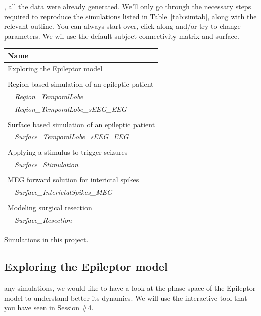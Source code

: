 \documentclass{tufte-handout}
\begin{document}
, all the data were already generated. We'll only go through the necessary steps 
required to reproduce the simulations listed in Table~\ref{tab:simtab}, along with the relevant outline.
You can always start over, click along and/or try to change parameters.
We wil use the default subject connectivity matrix and surface.


\begin{margintable}
  \centering
  \selectfont
  \begin{tabular}{l}
    \toprule
    Name \\
    \midrule
    Exploring the Epileptor model\\
    \\
    Region based simulation of an epileptic patient \\
    $\quad$\textit{Region\_TemporalLobe} \\
    $\quad$\textit{Region\_TemporalLobe\_sEEG\_EEG}  \\
    \\
    Surface based simulation of an epileptic patient \\
    $\quad$\textit{Surface\_TemporalLobe\_sEEG\_EEG}  \\
    \\
    Applying a stimulus to trigger seizures \\
    $\quad$\textit{Surface\_Stimulation}  \\ 
    \\
    MEG forward solution for interictal spikes \\
    $\quad$\textit{Surface\_InterictalSpikes\_MEG} \\
    \\
    Modeling surgical resection\\
    $\quad$\textit{Surface\_Resection} \\
    \bottomrule
  \end{tabular}
  \caption{Simulations in this project.}
  \label{tab:simtab}
\end{margintable}


\subsection{Exploring the Epileptor model}\label{sec:epileptor}


 any simulations, we would like to have a look at the phase space of the Epileptor model
to understand better its dynamics. We will use the interactive tool that you have seen in Session \#4.
\end{document}
